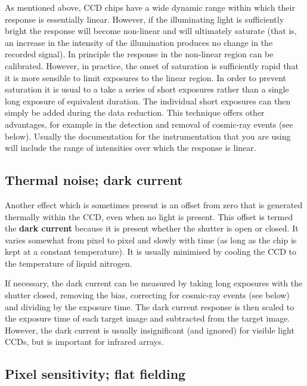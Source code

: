 \documentclass[twoside,11pt]{starlink}
\begin{document}
As mentioned above, CCD chips have a wide dynamic range within which
their response is essentially linear.  However, if the illuminating
light is sufficiently bright the response will become non-linear and will
ultimately saturate (that is, an increase in the intensity of the
illumination produces no change in the recorded signal).  In principle
the response in the non-linear region can be calibrated.  However, in
practice, the onset of saturation is sufficiently rapid that it is more
sensible to limit exposures to the linear region.  In order to prevent
saturation it is usual to a take a series of short exposures rather than
a single long exposure of equivalent duration.  The individual short
exposures can then simply be added during the data reduction.  This
technique offers other advantages, for example in the detection and removal
of cosmic-ray events (see below).  Usually the documentation for the
instrumentation that you are using will include the range of intensities
over which the response is linear.

\subsection{Thermal noise; dark current}

Another effect which is sometimes present is an offset from zero that is
generated thermally within the CCD, even when no light is present.  This
offset is termed the \textbf{dark current} because it is present whether the
shutter is open or closed.  It varies somewhat from pixel to pixel and
slowly with time (as long as the chip is kept at a constant temperature).
It is usually minimised by cooling the CCD to the temperature of liquid
nitrogen.

If necessary, the dark current can be measured by taking long exposures with
the shutter closed, removing the bias, correcting for cosmic-ray events (see
below) and dividing by the exposure time.  The dark current response is then
scaled to the exposure time of each target image and subtracted from the
target image.  However, the dark current is usually insignificant (and
ignored) for visible light CCDs, but is important for infrared arrays.

\subsection{Pixel sensitivity; flat fielding}
\end{document}
